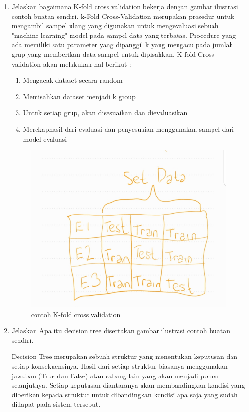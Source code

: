 \begin{enumerate}
\item Jelaskan bagaimana K-fold cross validation bekerja dengan gambar ilustrasi contoh buatan sendiri.
k-Fold Cross-Validation merupakan prosedur untuk mengambil sampel ulang yang digunakan untuk mengevaluasi sebuah "machine learning" model pada sampel data yang terbatas. Procedure yang ada memiliki satu parameter yang dipanggil k yang mengacu pada jumlah grup yang memberikan data sampel untuk dipisahkan.
K-fold Cross-validation akan melakukan hal berikut : 
\begin{enumerate}
    \item Mengacak dataset secara random
    \item Memisahkan dataset menjadi k group
    \item Untuk setiap grup, akan disesuaikan dan dievaluasikan
    \item Merekaphasil dari evaluasi dan penyesuaian menggunakan sampel dari model evaluasi
\end{enumerate}
\begin{figure}[H]
\centering
\includegraphics[scale=0.2]{figures/1174035/chapter2/kcode.jpeg}
\caption{contoh K-fold cross validation}
\label{contoh3}
\end{figure}


\item Jelaskan Apa itu decision tree disertakan gambar ilustrasi contoh buatan sendiri.\par
Decision Tree merupakan sebuah struktur yang menentukan keputusan dan setiap konsekuensinya. Hasil dari setiap struktur biasanya menggunakan jawaban (True dan False) atau cabang lain yang akan menjadi pohon selanjutnya. Setiap keputusan diantaranya akan membandingkan kondisi yang diberikan kepada struktur untuk dibandingkan kondisi apa saja yang sudah didapat pada sistem tersebut. 



\end{enumerate}
